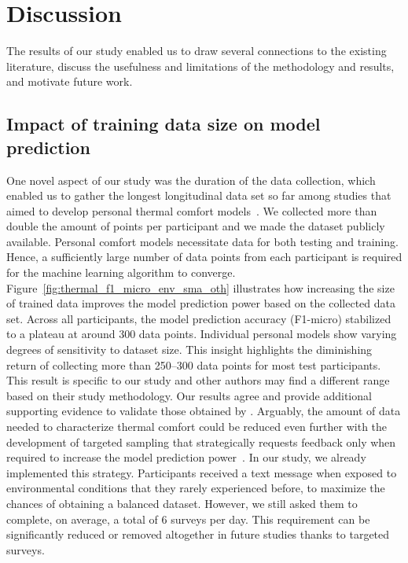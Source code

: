 \section{Discussion}\label{sec:discussion}
The results of our study enabled us to draw several connections to the existing literature, discuss the usefulness and limitations of the methodology and results, and motivate future work. 

\subsection{Impact of training data size on model prediction}\label{subsec:effect-of-data-size-on-model-prediction}
One novel aspect of our study was the duration of the data collection, which enabled us to gather the longest longitudinal data set so far among studies that aimed to develop personal thermal comfort models~\cite{ArakawaMartins2022}.
We collected more than double the amount of points per participant and we made the dataset publicly available.
Personal comfort models necessitate data for both testing and training.
Hence, a sufficiently large number of data points from each participant is required for the machine learning algorithm to converge.
Figure~\ref{fig:thermal_f1_micro_env_sma_oth} illustrates how increasing the size of trained data improves the model prediction power based on the collected data set.
Across all participants, the model prediction accuracy (F1-micro) stabilized to a plateau at around 300 data points.
Individual personal models show varying degrees of sensitivity to dataset size.
This insight highlights the diminishing return of collecting more than 250--300 data points for most test participants.
This result is specific to our study and other authors may find a different range based on their study methodology.
Our results agree and provide additional supporting evidence to validate those obtained by \textcite{Liu2019a}.
Arguably, the amount of data needed to characterize thermal comfort could be reduced even further with the development of targeted sampling that strategically requests feedback only when required to increase the model prediction power~\cite{Roa2020-fz}.
In our study, we already implemented this strategy. 
Participants received a text message when exposed to environmental conditions that they rarely experienced before, to maximize the chances of obtaining a balanced dataset.
However, we still asked them to complete, on average, a total of 6 surveys per day.
This requirement can be significantly reduced or removed altogether in future studies thanks to targeted surveys.
